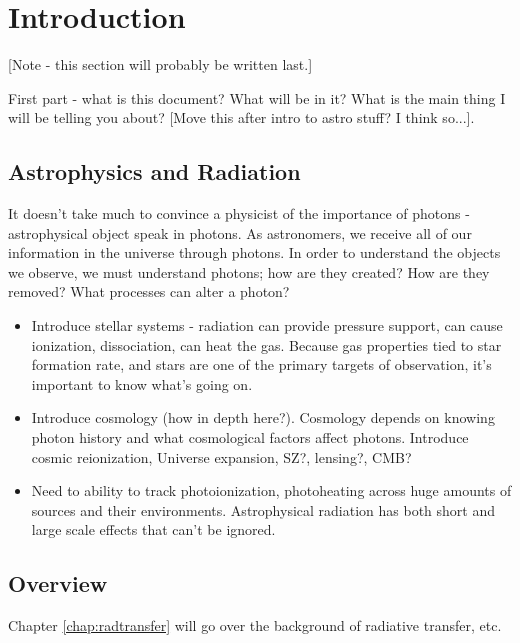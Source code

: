 \pagestyle{fancy}
\headheight 20pt
\chead{}
\lfoot{}
\cfoot{\thepage}
\rfoot{}
\renewcommand{\headrulewidth}{0.1pt}
\renewcommand{\footrulewidth}{0.1pt}

\chapter{Introduction}
\label{chap:intro} 
\thispagestyle{fancy} 

[Note - this section will probably be written last.]

First part - what is this document? What will be in it? What is the main thing I will be telling you about? [Move this after intro to astro stuff? I think so...].

\section{Astrophysics and Radiation}
\label{sec:astroandrad}

It doesn't take much to convince a physicist of the importance of photons - astrophysical object speak in photons. As astronomers, we receive all of our information in the universe through photons. In order to understand the objects we observe, we must understand photons; how are they created? How are they removed? What processes can alter a photon?

\begin{itemize}
\item Introduce stellar systems -  radiation can provide pressure support, can cause ionization, dissociation, can heat the gas. Because gas properties tied to star formation rate, and stars are one of the primary targets of observation, it's important to know what's going on.
\item Introduce cosmology (how in depth here?). Cosmology depends on knowing photon history and what cosmological factors affect photons. Introduce cosmic reionization, Universe expansion, SZ?, lensing?, CMB?
\item Need to ability to track photoionization, photoheating across huge amounts of sources and their environments. Astrophysical radiation has both short and large scale effects that can't be ignored.
\end{itemize}

%
%
%
%
% 
%
%
% 
%


\section{Overview}

Chapter \ref{chap:radtransfer} will go over the background of radiative transfer, etc.

